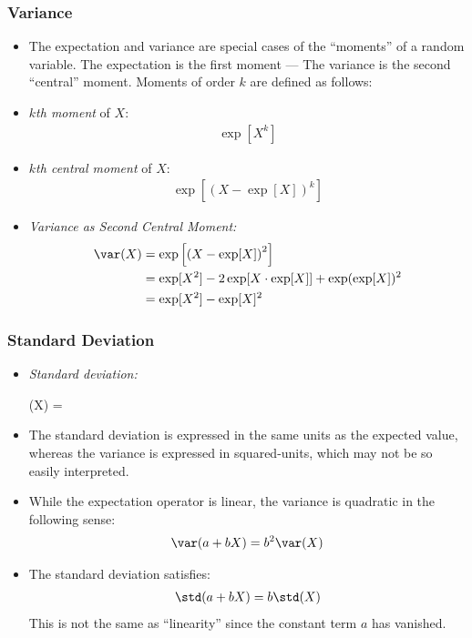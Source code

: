 

\begin{frame}
\frametitle{Variance}
\begin{itemize}
\item The expectation and variance are special cases of the ``moments'' of a random variable. The expectation is the first moment --- The variance is the second ``central'' moment. Moments of order $k$ are defined as follows:
\item \emph{$k$th moment} of $X$: 
\begin{align*}
\exp[X^k]
\end{align*}
\item \emph{$k$th central moment} of $X$: 
\begin{align*}
\exp\left[\left(X - \exp[X]\right)^k\right]
\end{align*}
\item \emph{Variance as Second Central Moment:}
\begin{align*}
\var(X) 
  & = \exp\left[ \left(X - \exp[X]\right)^2 \right]\\
  & = \exp[X^2] - 2\exp[X\cdot\exp[X]] +\exp(\exp[X])^2\\
  & = \exp[X^2] - \exp[X]^2
\end{align*}
\end{itemize}
\end{frame}


\begin{frame}
\frametitle{Standard Deviation}
\begin{itemize}
\item \emph{Standard deviation:}
\begin{emphalign*}
\std(X) = 
\end{emphalign*}
\item The standard deviation is expressed in the same units as the expected value, whereas the variance is expressed in squared-units, which may not be so easily interpreted.
\item While the expectation operator is linear, the variance is quadratic in the following sense:
\begin{align*}
\var(a + b X) = b^2 \var(X)
\end{align*}
\item The standard deviation satisfies:
\begin{align*}
\std(a + b X) = b \std(X)
\end{align*}
This is not the same as ``linearity'' since the constant term $a$ has vanished.
\end{itemize}
\end{frame}

